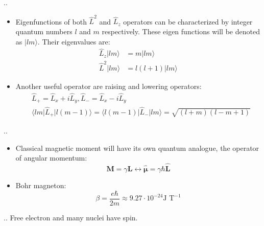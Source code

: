 \documentclass{beamer}
\begin{document}
\begin{frame}{\thesection.\thesubsection. \insertsubsection}
	\begin{itemize}[<+>]
		\item Eigenfunctions of both $\hat{L}^2$ and $\hat{L}_z$ operators can be characterized by integer quantum numbers $l$  and $m$ respectively. These eigen functions will be denoted as $\vert lm \rangle$. Their eigenvalues are:
		\begin{align}
		\hat{L}_z \vert lm \rangle &= m \vert lm \rangle \\
		\hat{L}^2 \vert lm \rangle &= l(l+1) \vert lm \rangle
		\end{align}
		\item Another useful operator are raising and lowering operators:
		\begin{align}
		  &\hat{L}_{+} = \hat{L}_x + i\hat{L}_y, \hat{L}_{-} = \hat{L}_x - i\hat{L}_y\\
		  &\langle lm \vert \hat{L}_{+} \vert l (m-1) \rangle = \langle l(m-1) \vert \hat{L}_{-} \vert lm \rangle = \sqrt{(l+m)(l-m+1)}
		\end{align}
	\end{itemize}
	
\end{frame}


\begin{frame}{\thesection.\thesubsection. \insertsubsection}
	\begin{itemize}[<+>]
		\item
			Classical magnetic moment will have its own quantum analogue, the operator of angular momentum:
			\begin{equation}
			\bm{M} = \gamma \bm{L}  \longleftrightarrow \bm{\hat{\mu}} = \gamma \hbar \bm{\hat{L}}
			\end{equation} 
		\item Bohr magneton:
		\begin{equation}
			\beta = \dfrac{e\hbar}{2m} \approx 9.27 \cdot 10^{-24}  \text{J T}^{-1}
		\end{equation}
	\end{itemize}

\end{frame}


\begin{frame}{\thesection.\thesubsection. \insertsubsection}
	Free electron and many nuclei have spin. 
\end{frame}
\end{document}
